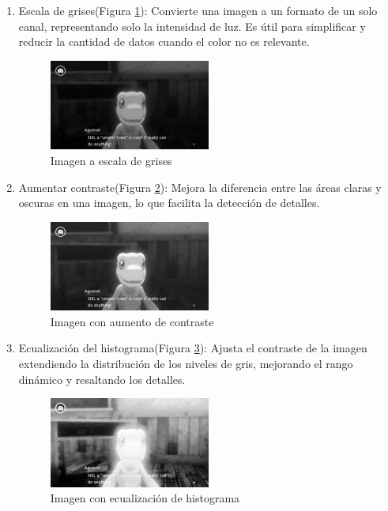 \begin{enumerate}
	\item Escala de grises(Figura \ref{fig:EscalaGrises}):
	Convierte una imagen a un formato de un solo canal, representando solo la intensidad de luz. Es útil para simplificar y reducir la cantidad de datos cuando el color no es relevante.
	\begin{figure}[H]
		\centering
		\includegraphics[width = 0.5\textwidth]{Imagenes/Preprocesado/1.png}
		\caption{Imagen a escala de grises}
		\label{fig:EscalaGrises}
	\end{figure}
	\item Aumentar contraste(Figura \ref{fig:Contraste}): 
	Mejora la diferencia entre las áreas claras y oscuras en una imagen, lo que facilita la detección de detalles.
	\begin{figure}[H]
		\centering
		\includegraphics[width = 0.5\textwidth]{Imagenes/Preprocesado/2.png}
		\caption{Imagen con aumento de contraste}
		\label{fig:Contraste}
	\end{figure}
	\item Ecualización del histograma(Figura \ref{fig:Histograma}):
	Ajusta el contraste de la imagen extendiendo la distribución de los niveles de gris, mejorando el rango dinámico y resaltando los detalles.
	\begin{figure}[H]
		\centering
		\includegraphics[width = 0.5\textwidth]{Imagenes/Preprocesado/3.png}
		\caption{Imagen con ecualización de histograma}
		\label{fig:Histograma}
	\end{figure}
	

\end{enumerate}
